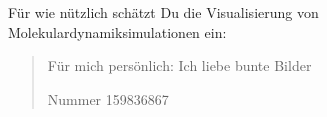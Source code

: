 Für wie nützlich schätzt Du die Visualisierung von Molekulardynamiksimulationen ein: \blockquote[Nummer 159836867]{Für mich persönlich: Ich liebe bunte Bilder}



\printbibliography[heading=bibintoc]\label{sec:bibliography}

\printindex %

